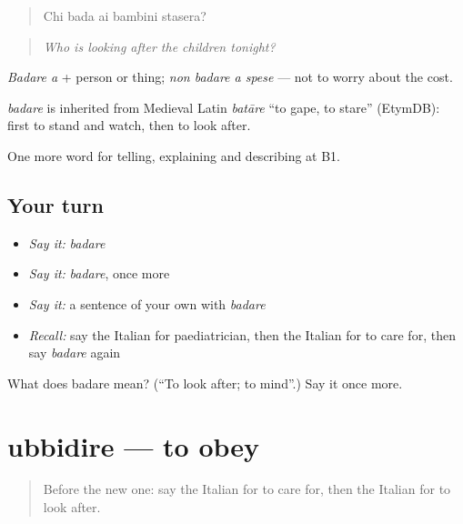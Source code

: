 \begin{quote}
Chi bada ai bambini stasera?
\end{quote}

\begin{quote}
\emph{Who is looking after the children tonight?}
\end{quote}

\emph{Badare a} + person or thing; \emph{non badare a spese} — not to worry about the cost.

\begin{cousinweb}
\emph{badare} is inherited from Medieval Latin \emph{batāre} \textquotedblleft{}to gape, to stare\textquotedblright{} (EtymDB): first to stand and watch, then to look after.
\end{cousinweb}

\begin{grammarlens}[title={What you've built}]
One more word for telling, explaining and describing at B1.
\end{grammarlens}

\subsection*{Your turn}
\begin{itemize}
\raggedright
  \item \emph{Say it:} \emph{badare}
  \item \emph{Say it:} \emph{badare}, once more
  \item \emph{Say it:} a sentence of your own with \emph{badare}
  \item \emph{Recall:} say the Italian for paediatrician, then the Italian for to care for, then say \emph{badare} again
\end{itemize}

\begin{tcolorbox}[breakable,colback=teal!4,colframe=teal!35!black,title={Before you move on}]
What does badare mean? (\textquotedblleft{}To look after; to mind\textquotedblright{}.) Say it once more.
\end{tcolorbox}
\section[ubbidire]{ubbidire — to obey}

\label{lesson:IT-C498-ubbidire}



\begin{quote}
Before the new one: say the Italian for to care for, then the Italian for to look after.
\end{quote}


